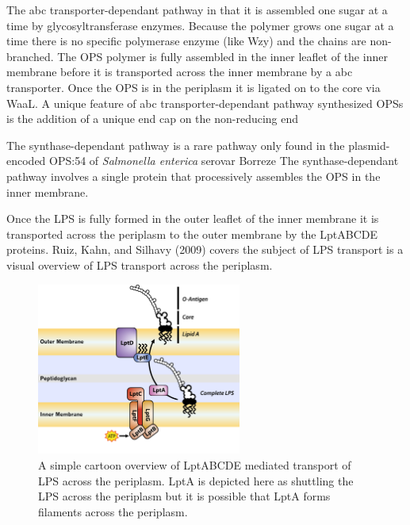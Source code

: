 The \ac{abc} transporter-dependant pathway in that  it is assembled one sugar at
a time by glycosyltransferase enzymes. Because the polymer grows one sugar at a
time there is no specific polymerase enzyme (like Wzy) and the chains are
non-branched. The \ac{OPS} polymer is fully assembled in the inner leaflet of
the inner membrane before it is transported across the inner membrane by a
\ac{abc} transporter. Once the \ac{OPS} is in the periplasm it is ligated on to
the core via WaaL.
A unique feature of \ac{abc} transporter-dependant pathway synthesized \acp{OPS} is the addition of a unique end cap on the non-reducing end 

The synthase-dependant pathway is a rare pathway only found in the plasmid-encoded \ac{OPS}:54 of \textit{Salmonella enterica} serovar Borreze The synthase-dependant pathway involves a single protein that processively assembles the \ac{OPS} in the inner membrane.

Once the \ac{LPS} is fully formed in the outer leaflet of the inner membrane it is transported across the periplasm to the outer membrane by the LptABCDE proteins. Ruiz, Kahn, and Silhavy (2009) covers the subject of \ac{LPS} transport  is a visual overview of \ac{LPS} transport across the periplasm.
 
\begin{figure}[htb]
  	\begin{center}
   		\includegraphics[width=0.6\textwidth]{intro/img/lpstransport.pdf}
   	\end{center}
   	\caption[A simple overview of \ac{LPS} transport across the periplasm]{ A simple cartoon overview of  LptABCDE mediated transport of \ac{LPS} across the periplasm. LptA is depicted here as shuttling the \ac{LPS} across the periplasm but it is possible that LptA forms filaments across the periplasm.}
\label{fig:lpstransport}
\end{figure}   

